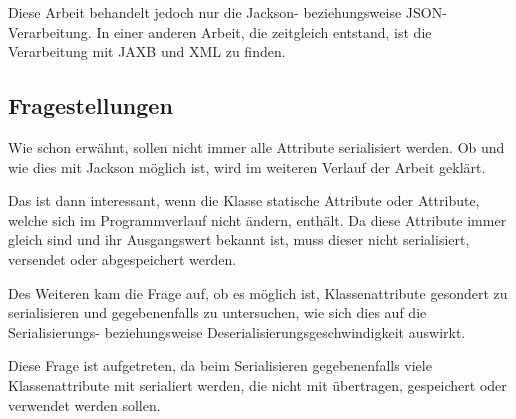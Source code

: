 Diese Arbeit behandelt jedoch nur die Jackson- beziehungsweise \ac{JSON}-Verarbeitung. In einer anderen Arbeit, die zeitgleich entstand, ist die Verarbeitung mit \ac{JAXB} und XML zu finden. \cite{Wal14} 

\subsection{Fragestellungen}
Wie schon erw\"ahnt, sollen nicht immer alle Attribute serialisiert werden. Ob und wie dies mit Jackson m\"oglich ist, wird im weiteren Verlauf der Arbeit gekl\"art. 

Das ist dann interessant, wenn die Klasse statische Attribute oder Attribute, welche sich im Programmverlauf nicht \"andern, enth\"alt. Da diese Attribute immer gleich sind und ihr Ausgangswert bekannt ist, muss dieser nicht serialisiert, versendet oder abgespeichert werden.

Des Weiteren kam die Frage auf, ob es m\"oglich ist, Klassenattribute gesondert zu serialisieren und gegebenenfalls zu untersuchen, wie sich dies auf die Serialisierungs- beziehungsweise Deserialisierungsgeschwindigkeit auswirkt.

Diese Frage ist aufgetreten, da beim Serialisieren gegebenenfalls viele Klassenattribute mit serialiert werden, die nicht mit \"ubertragen, gespeichert oder verwendet werden sollen. 
